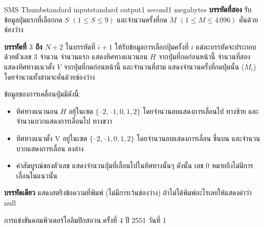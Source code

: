 \documentclass[11pt,a4paper]{article}
\begin{document}
\begin{problem}{SMS Thumb}{standard input}{standard output}{1 second}{1 megabytes}
\textbf{บรรทัดที่สอง} รับข้อมูลปุ่มแรกที่เลือกกด $S$ $(1 \leq S \leq 9)$ และจำนวนครั้งที่กด $M$ $(1 \leq M \leq 4\,096)$ คั่นด้วยช่องว่าง

\textbf{บรรทัดที่ $3$ ถึง $N+2$} ในบรรทัดที่ $i+1$ ให้รับข้อมูลการเลือกปุ้มครั้งที่ $i$ แต่ละบรรทัดจะประกอบด้วยตัวเลข $3$ จำนวน จำนวนแรก แสดงทิศทางแนวนอน $H$ จากปุ่มที่กดก่อนหน้านี้ จำนวนที่สอง แสดงทิศทางแนวตั้ง $V$ จากปุ่มที่กดก่อนหน้านี้ และจำนวนที่สาม แสดงจำนวนครั้งที่กดปุ่มนั้น ($M_i$) โดยจำนวนทั้งสามจะคั่นด้วยช่องว่าง

ข้อมูลของการเคลื่อนปุ่มมีดังนี้:
\begin{itemize}

\item ทิศทางแนวนอน $H$ อยุ้ในเซต $\{ –2, –1, 0, 1, 2 \}$ โดยจำนวนลบแสดงการเลื่อนไป ทางซ้าย และจำนวนบวกแสดงการเลื่อนไป ทางขวา
\item ทิศทางแนวตั้ง V อยู่ในเซต $\{ –2, –1, 0, 1, 2 \}$ โดยจำนวนลบแสดงการเลื่อน ขึ้นบน และจำนวนบวกแสดงการเลื่อน ลงล่าง
\item ค่าสัมบูรณ์ของตัวเลข แสดงจำนวนปุ่มที่เลื่อนไปในทิศทางนั้นๆ ดังนั้น เลข 0 หมายถึงไม่มีการเลื่อนในแนวนั้น
\end{itemize}

\OutputFile

\textbf{บรรทัดเดียว} แสดงสตริงข้อความที่พิมพ์ (ไม่มีการเว้นช่องว่าง) ถ้าไม่ได้พิมพ์อะไรเลยให้แสดงคำว่า null 

\Examples

\begin{example}
%
%
%
\end{example}


\Source

การแข่งขันคอมพิวเตอร์โอลิมปิกสอวน.ครั้งที่ 4 ปี 2551 วันที่ 1

\end{problem}
\end{document}
